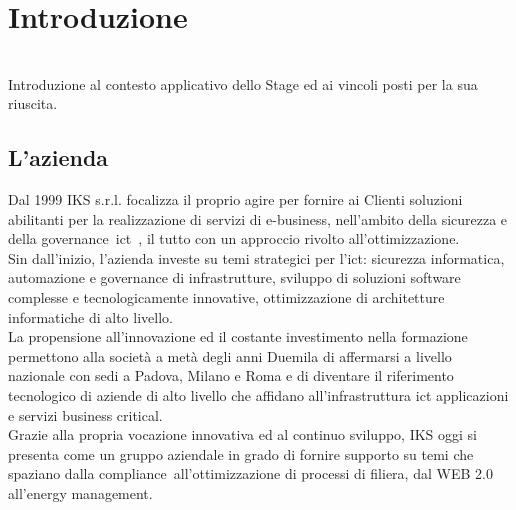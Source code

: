 
\chapter{Introduzione}
\label{cap:introduzione}

\\
Introduzione al contesto applicativo dello Stage ed ai vincoli posti per la sua riuscita.




\section{L'azienda}

Dal 1999 IKS s.r.l. focalizza il proprio agire per fornire ai Clienti soluzioni abilitanti per la realizzazione di servizi di e-business, nell’ambito della sicurezza e della \gls{governance}\glsfirstoccur\  \gls{ict}\glsfirstoccur\ , il tutto con un approccio rivolto all’ottimizzazione.\\
Sin dall’inizio, l’azienda investe su temi strategici per l’\gls{ict}: sicurezza informatica, automazione e \gls{governance} di infrastrutture, sviluppo di soluzioni software complesse e tecnologicamente innovative, ottimizzazione di architetture informatiche di alto livello.\\
La propensione all’innovazione ed il costante investimento nella formazione permettono alla società a metà degli anni Duemila di affermarsi a livello nazionale con sedi a Padova, Milano e Roma e di diventare il riferimento tecnologico di aziende di alto livello che affidano all’infrastruttura \gls{ict} applicazioni e servizi business critical.\\
Grazie alla propria vocazione innovativa ed al continuo sviluppo, IKS oggi si presenta come un gruppo aziendale in grado di fornire supporto su temi che spaziano dalla \gls{compliance}\glsfirstoccur\  all’ottimizzazione di processi di filiera, dal WEB 2.0 all’energy management.

